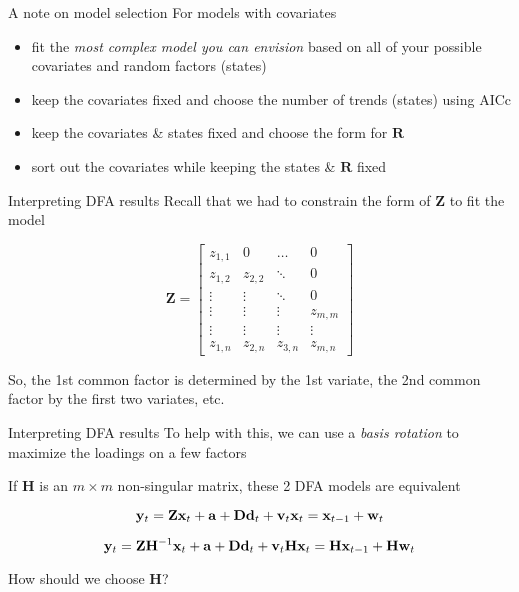 \documentclass[
  ignorenonframetext,
]{beamer}
\begin{document}
\begin{frame}{A note on model selection \textbar{} For models with
covariates}
\protect\hypertarget{a-note-on-model-selection-for-models-with-covariates}{}
\begin{itemize}
\item
  fit the \emph{most complex model you can envision} based on all of
  your possible covariates and random factors (states)
\item
  keep the covariates fixed and choose the number of trends (states)
  using AICc
\item
  keep the covariates \& states fixed and choose the form for
  \(\mathbf{R}\)
\item
  sort out the covariates while keeping the states \& \(\mathbf{R}\)
  fixed
\end{itemize}
\end{frame}

\begin{frame}{Interpreting DFA results}
\protect\hypertarget{interpreting-dfa-results}{}
Recall that we had to constrain the form of \(\mathbf{Z}\) to fit the
model

\[
\mathbf{Z} =
\begin{bmatrix}
 z_{1,1} & 0 & \dots & 0 \\
 z_{1,2} & z_{2,2} & \ddots & 0 \\
 \vdots & \vdots & \ddots & 0 \\
 \vdots & \vdots & \vdots & z_{m,m}  \\
 \vdots & \vdots & \vdots & \vdots \\
 z_{1,n} & z_{2,n} & z_{3,n} & z_{m,n} 
\end{bmatrix}
\]

So, the 1st common factor is determined by the 1st variate, the 2nd
common factor by the first two variates, etc.
\end{frame}

\begin{frame}{Interpreting DFA results}
\protect\hypertarget{interpreting-dfa-results-1}{}
To help with this, we can use a \emph{basis rotation} to maximize the
loadings on a few factors

If \(\mathbf{H}\) is an \(m \times m\) non-singular matrix, these 2 DFA
models are equivalent

\[
\mathbf{y}_t = \mathbf{Z} \mathbf{x}_t + \mathbf{a} + \mathbf{D} \mathbf{d}_t + \mathbf{v}_t \\
\mathbf{x}_t = \mathbf{x}_{t-1} + \mathbf{w}_t
\]

\[
\mathbf{y}_t = \mathbf{Z} \mathbf{H}^{-1} \mathbf{x}_t + \mathbf{a} + \mathbf{D} \mathbf{d}_t + \mathbf{v}_t \\
\mathbf{H} \mathbf{x}_t = \mathbf{H} \mathbf{x}_{t-1} + \mathbf{H} \mathbf{w}_t
\]

How should we choose \(\mathbf{H}\)?
\end{frame}
\end{document}
